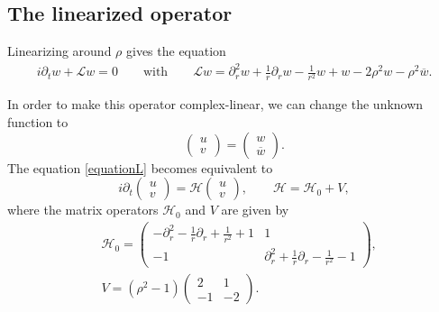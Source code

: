 \documentclass[11 pt]{amsart}
\theoremstyle{definition}
\theoremstyle{remark}
\numberwithin{equation}{section}
\begin{document}
\subsection{The linearized operator}
\label{subsectionlinearized}
Linearizing around $\rho$ gives the equation
\begin{equation}
\begin{split}
\label{equationL}
i \partial_t w + \mathcal{L} w = 0 \qquad \mbox{with} \qquad
\mathcal{L} w = \partial_r^2 w + \frac{1}{r} \partial_r w - \frac{1}{r^2} w + w - 2 \rho^2 w - \rho^2 \overline{w}.
\end{split}
\end{equation}

In order to make this operator complex-linear, we can change the unknown function to
$$
\begin{pmatrix} u \\ v \end{pmatrix} = \begin{pmatrix} w \\ \overline{w} \end{pmatrix}.
$$
The equation \eqref{equationL} becomes equivalent to
\begin{equation}
\label{evolutionH}
i \partial_t \begin{pmatrix} u \\ v \end{pmatrix} = \mathcal{H} \begin{pmatrix} u \\ v \end{pmatrix} , \qquad 
\mathcal{H} = \mathcal{H}_0 + V,
\end{equation}
where the matrix operators $\mathcal{H}_0$ and $V$ are given by
\begin{align*}
& \mathcal{H}_0 = \begin{pmatrix} -\partial_r^2 - \frac{1}{r} \partial_r + \frac{1}{r^2} + 1 & 1 \\ -1 & \partial_r^2 + \frac{1}{r} \partial_r - \frac{1}{r^2} - 1 \end{pmatrix}, \\
& V = (\rho^2 - 1)\begin{pmatrix} 2 & 1 \\ -1 & -2 \end{pmatrix}.
\end{align*}
\end{document}
